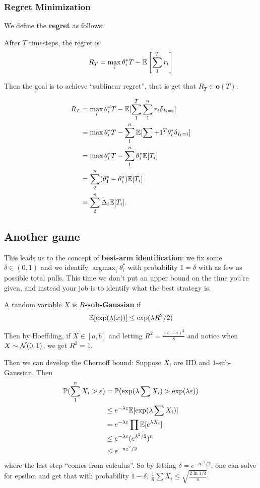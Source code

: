 \documentclass[12pt]{article}
\DeclareMathOperator*{\argmax}{argmax}
\begin{document}
\subsubsection{Regret Minimization}
We define the \textbf{regret} as follows:
\begin{defn}
	After $T$ timesteps, the regret is 
	\[R_T=\max_i\theta_i^\ast T-\mathbb{E}\left[\sum_1^T r_t\right]\]
\end{defn}
Then the goal is to achieve ``sublinear regret'', that is get that $R_T\in\mathbf{o}(T)$.
\begin{lem}
	\begin{align*}
		R_T&=\max_i\theta_i^\ast T-\mathbb{E}[\sum_1^T\sum_1^n r_t\delta_{I_t=i}]\\
		&=\max\theta_i^\ast T - \sum_1^n\mathbb{E}[\sum+1^T\theta_i^\ast\delta_{I_t=i}]\\
		&=\max\theta_i^\ast T-\sum_1^n\theta_i^\ast\mathbb{E}[T_i]\\
		&=\sum_2^n(\theta_1^\ast-\theta_i^\ast)\mathbb{E}[T_i]\\
		&=\sum_2^n\Delta_i\mathbb{E}[T_i].
	\end{align*}
\end{lem}

\subsection{Another game}
This leads us to the concept of \textbf{best-arm identification}: we fix some $\delta\in(0,1)$ and we identify $\argmax_i\theta_i^\ast$ with probability $1=\delta$ with as few as possible total pulls.
This time we don't put an upper bound on the time you're given, and instead your job is to identify what the best strategy is.

\begin{defn}
	A random variable $X$ is \textbf{$R$-sub-Gaussian} if 
	\[\mathbb{E}[\exp(\lambda(x))]\le\exp(\lambda R^2/2)\]
\end{defn}
\begin{rmk}
	Then by Hoeffding, if $X\in[a,b]$  and letting $R^2=\frac{(b-a)^2}{8}$ and notice when $X\sim \mathcal{N}(0,1)$, we get $R^2=1$.
\end{rmk}

Then we can develop the Chernoff bound: Suppose $X_i$ are IID and $1$-sub-Gaussian. Then 
\begin{align*}
	\mathbb{P}(\sum_1^n X_i >\varepsilon)&=\mathbb{P}(\exp(\lambda\sum X_i) >\exp(\lambda\varepsilon))\\
	&\le e^{-\lambda\varepsilon}\mathbb{E}[\exp(\lambda\sum X_i)]\\
	&= e^{-\lambda\varepsilon}\prod\mathbb{E}[e^{\lambda X_i}]\\
	&\le e^{-\lambda\varepsilon}(e^{\lambda^2/2})^n\\
	&\le e^{-n\varepsilon^2/2}
\end{align*}
where the last step ``comes from calculus''. So by letting $\delta=e^{-n\varepsilon^2/2}$, one can solve for epsilon
and get that with probability $1-\delta$, $\frac{1}{n}\sum X_i\le\sqrt{\frac{2\ln 1/\delta}{n}}$.
\end{document}
